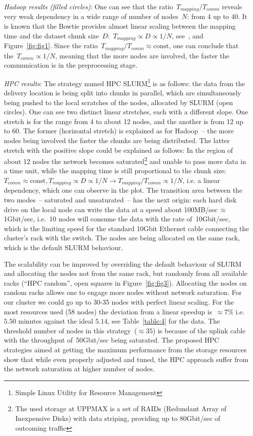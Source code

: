 \documentclass[11pt, oneside]{article}   	%
\begin{document}
\textit{Hadoop results (filled circles)}: One can see that the ratio~$T_{mapping}/T_{comm}$ reveals very weak dependency in a wide range of number of nodes~$N$: from 4 up to 40. It is known that the Bowtie provides almost  linear scaling between the mapping time and the dataset chunk size~$D$:~$T_{mapping}\propto  D\propto 1/N$, see~\cite{bowtie}, and Figure~\ref{fig:fig1}. Since the ratio~$T_{mapping}/T_{comm}\approx \mbox{const}$, one can conclude that the~$T_{comm}\propto 1/N$, meaning that the more nodes are involved, the faster the communication is in the preprocessing stage.

\textit{HPC results}: The strategy named HPC SLURM\footnote{Simple Linux Utility for Resource Management} is as follows: the data from the delivery location is being split into chunks in parallel, which are simultaneously being pushed to the local scratches of the nodes, allocated by SLURM  (open circles). One can see two distinct linear stretches, each with a different slope. One stretch is for the range from 4 to about 12 nodes, and the another is from 12 up to 60. The former (horizontal stretch) is explained as for Hadoop~-- the more nodes being involved the faster the chunks are being distributed. The latter stretch with the positive slope could be explained as follows: In the region of about 12 nodes the network becomes saturated\footnote{The used storage at UPPMAX is a set of RAIDs (Redundant Array of Inexpensive Disks) with data striping, providing up to $80$Gbit/sec of outcoming traffic} and unable to pass more data in a time unit, while the mapping time is still proportional to the chunk size:~$T_{comm}\approx\mbox{const}, T_{mapping}\propto D\propto 1/N \rightarrow T_{mapping}/T_{comm}\propto 1/N$, i.e. a linear dependency, which one can observe in the plot. 
The transition area between the two modes~-- saturated and unsaturated~-- has the next origin: each hard disk drive on the local node can write the data at a speed about 100MB/sec\,$\approx$\,1Gbit/sec, i.e.~10 nodes will consume the data with the rate of~10Gbit/sec, which is the limiting speed for the standard 10Gbit Ethernet cable connecting the cluster's rack with the switch. The nodes are being allocated  on the same rack, which is the default SLURM behaviour. 

The scalability can be improved by overriding the default behaviour of SLURM and allocating the nodes not from the same rack, but randomly from all available racks (``HPC random'', open squares in Figure~\ref{fig:fig3}). Allocating the nodes on random racks allows one to engage more nodes without network saturation. For our cluster we could go up to 30-35 nodes with perfect linear scaling. For the most resources used (58 nodes) the deviation from a linear speedup is~$\approx 7\%$ i.e. $5.50$ minutes against the ideal $5.14$, see Table~\ref{table:4}  for the data. The threshold number of nodes in this strategy~($\approx35$) is because of the uplink cable with the throughput of~50Gbit/sec being saturated. 
The proposed HPC strategies aimed at getting the maximum performance from the storage resources show that while even properly adjusted and tuned, the HPC approach suffer from the network saturation at higher number of nodes.
\end{document}
